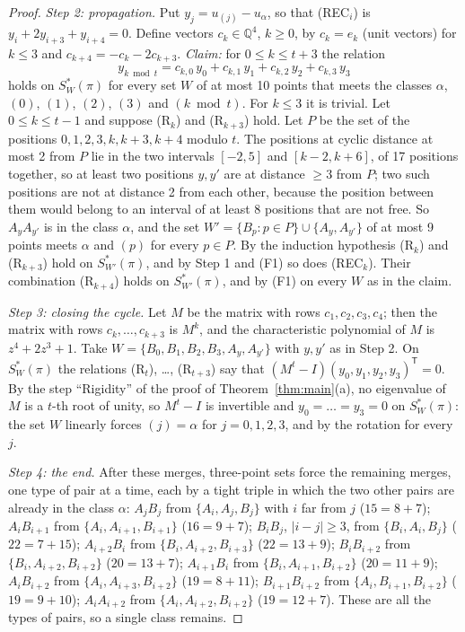 \documentclass[11pt,a4paper]{article}
\theoremstyle{definition}
\theoremstyle{remark}
\newcommand{\Q}{\mathbb{Q}}
\newcommand{\step}[1]{\smallskip\noindent\emph{#1}}
\begin{document}
\begin{proof}
\step{Step 2: propagation.} Put $y_j = u_{(j)} - u_\alpha$, so that (REC$_i$) is $y_i + 2y_{i+3} + y_{i+4} = 0$.
Define vectors $c_k \in \Q^4$, $k \ge 0$, by $c_k = e_k$ (unit vectors) for $k \le 3$ and
$c_{k+4} = -c_k - 2c_{k+3}$. \emph{Claim:} for $0 \le k \le t + 3$ the relation
\[
  y_{k \bmod t} = c_{k,0}\,y_0 + c_{k,1}\,y_1 + c_{k,2}\,y_2 + c_{k,3}\,y_3 \tag{R$_k$}
\]
holds on $S^*_W(\pi)$ for every set $W$ of at most 10 points that meets the classes $\alpha$, $(0)$, $(1)$, $(2)$,
$(3)$ and $(k \bmod t)$. For $k \le 3$ it is trivial. Let $0 \le k \le t - 1$ and suppose (R$_k$) and (R$_{k+3}$)
hold. Let $P$ be the set of the positions $0, 1, 2, 3, k, k + 3, k + 4$ modulo $t$. The positions at cyclic distance
at most 2 from $P$ lie in the two intervals $[-2, 5]$ and $[k - 2, k + 6]$, of 17 positions together, so at least two
positions $y, y'$ are at distance $\ge 3$ from $P$; two such positions are not at distance 2 from each other,
because the position between them would belong to an interval of at least 8 positions that are not free. So $A_yA_{y'}$ is in the class $\alpha$, and the set
$W' = \{B_p : p \in P\} \cup \{A_y, A_{y'}\}$ of at most 9 points meets $\alpha$ and $(p)$ for every $p \in P$. By the
induction hypothesis (R$_k$) and (R$_{k+3}$) hold on $S^*_{W'}(\pi)$, and by Step 1 and (F1) so does (REC$_k$).
Their combination (R$_{k+4}$) holds on $S^*_{W'}(\pi)$, and by (F1) on every $W$ as in the claim.

\step{Step 3: closing the cycle.} Let $M$ be the matrix with rows $c_1, c_2, c_3, c_4$; then the matrix with rows
$c_k, \dots, c_{k+3}$ is $M^k$, and the characteristic polynomial of $M$ is $z^4 + 2z^3 + 1$. Take
$W = \{B_0, B_1, B_2, B_3, A_y, A_{y'}\}$ with $y, y'$ as in Step 2. On $S^*_W(\pi)$ the relations
(R$_t$), \dots, (R$_{t+3}$) say that $(M^t - I)(y_0, y_1, y_2, y_3)^{\mathsf T} = 0$. By the step ``Rigidity'' of the
proof of Theorem~\ref{thm:main}(a), no eigenvalue of $M$ is a $t$-th root of unity, so $M^t - I$ is invertible and
$y_0 = \dots = y_3 = 0$ on $S^*_W(\pi)$: the set $W$ linearly forces $(j) = \alpha$ for $j = 0, 1, 2, 3$, and by
the rotation for every $j$.

\step{Step 4: the end.} After these merges, three-point sets force the remaining merges, one type of pair at a time,
each by a tight triple in which the two other pairs are already in the class $\alpha$:
$A_jB_j$ from $\{A_i, A_j, B_j\}$ with $i$ far from $j$ ($15 = 8 + 7$); $A_iB_{i+1}$ from
$\{A_i, A_{i+1}, B_{i+1}\}$ ($16 = 9 + 7$); $B_iB_j$, $|i - j| \ge 3$, from $\{B_i, A_i, B_j\}$ ($22 = 7 + 15$);
$A_{i+2}B_i$ from $\{B_i, A_{i+2}, B_{i+3}\}$ ($22 = 13 + 9$); $B_iB_{i+2}$ from $\{B_i, A_{i+2}, B_{i+2}\}$
($20 = 13 + 7$); $A_{i+1}B_i$ from $\{B_i, A_{i+1}, B_{i+2}\}$ ($20 = 11 + 9$); $A_iB_{i+2}$ from
$\{A_i, A_{i+3}, B_{i+2}\}$ ($19 = 8 + 11$); $B_{i+1}B_{i+2}$ from $\{A_i, B_{i+1}, B_{i+2}\}$ ($19 = 9 + 10$);
$A_iA_{i+2}$ from $\{A_i, A_{i+2}, B_{i+2}\}$ ($19 = 12 + 7$). These are all the types of pairs, so a single class
remains.
\end{proof}
\end{document}
